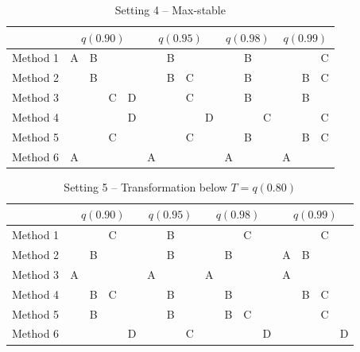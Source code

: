 \documentclass[11pt]{article}
\begin{document}
\begin{table}[htbp]
  \centering
  \caption{Setting 4 -- Max-stable}
  \label{tbl:mssim}
  \begin{tabular}{|l|cccc|cccc|ccc|ccc|}
    \cline{2-15}
    \multicolumn{1}{c}{} & \multicolumn{4}{|c}{$q(0.90)$} & \multicolumn{4}{|c}{$q(0.95)$} & \multicolumn{3}{|c}{$q(0.98)$} & \multicolumn{3}{|c|}{$q(0.99)$} \\
    \hline
    Method 1 & A & B &   &   &   & B &   &   &   & B &   &   &   & C \\
    \hline
    Method 2 &   & B &   &   &   & B & C &   &   & B &   &   & B & C \\
    \hline
    Method 3 &   &   & C & D &   &   & C &   &   & B &   &   & B &   \\
    \hline
    Method 4 &   &   &   & D &   &   &   & D &   &   & C &   &   & C \\
    \hline
    Method 5 &   &   & C &   &   &   & C &   &   & B &   &   & B & C \\
    \hline
    Method 6 & A &   &   &   & A &   &   &   & A &   &   & A &   &   \\
    \hline
  \end{tabular}
\end{table}

\begin{table}[htbp]
  \centering
  \caption{Setting 5 -- Transformation below $T = q(0.80)$}
  \label{tbl:transsim}
  \begin{tabular}{|l|cccc|ccc|cccc|cccc|}
    \cline{2-16}
    \multicolumn{1}{c}{} & \multicolumn{4}{|c}{$q(0.90)$} & \multicolumn{3}{|c}{$q(0.95)$} & \multicolumn{4}{|c}{$q(0.98)$} & \multicolumn{4}{|c|}{$q(0.99)$} \\
    \hline
    Method 1 &   &   & C &   &   & B &   &   &   & C &   &   &   & C &   \\
    \hline
    Method 2 &   & B &   &   &   & B &   &   & B &   &   & A & B &   &   \\
    \hline
    Method 3 & A &   &   &   & A &   &   & A &   &   &   & A &   &   &   \\
    \hline
    Method 4 &   & B & C &   &   & B &   &   & B &   &   &   & B & C &   \\
    \hline
    Method 5 &   & B &   &   &   & B &   &   & B & C &   &   &   & C &   \\
    \hline
    Method 6 &   &   &   & D &   &   & C &   &   &   & D &   &   &   & D \\
    \hline
  \end{tabular}
\end{table}

\begin{singlespace}


\end{singlespace}
\end{document}
